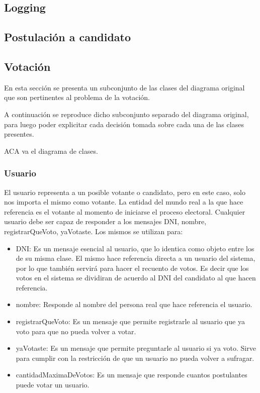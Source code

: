 \subsection{Logging}

\subsection{Postulaci\'on a candidato}

\subsection{Votaci\'on}


En esta secci\'on se presenta un subconjunto de las clases del diagrama original que son pertinentes al problema de la votaci\'on.

A continuaci\'on se reproduce dicho subconjunto separado del diagrama original, para luego poder explicitar cada decisi\'on tomada sobre cada una de las clases presentes.

ACA va el diagrama de clases.

\subsubsection{Usuario}

El usuario representa a un posible votante o candidato, pero en este caso, solo nos importa el mismo como votante. La entidad del mundo real a la que hace referencia es el votante al momento de iniciarse el proceso electoral. Cualquier usuario debe ser capaz de responder a los mensajes DNI, nombre, registrarQueVoto, yaVotaste. Los mismos se utilizan para:

\begin{itemize}
\item DNI: Es un mensaje esencial al usuario, que lo identica como objeto entre los de su misma clase. El mismo hace referencia directa a un usuario del sistema, por lo que tambi\'en servir\'a para hacer el recuento de votos. Es decir que los votos en el sistema se dividiran de acuerdo al DNI del candidato al que hacen referencia.
\item nombre: Responde al nombre del persona real que hace referencia el usuario.
\item registrarQueVoto: Es un mensaje que permite registrarle al usuario que ya voto para que no pueda volver a votar.
\item yaVotaste: Es un mensaje que permite preguntarle al usuario si ya voto. Sirve para cumplir con la restricci\'on de que un usuario no pueda volver a sufragar.
\item cantidadMaximaDeVotos: Es un mensaje que responde cuantos postulantes puede votar un usuario.
\end{itemize}

